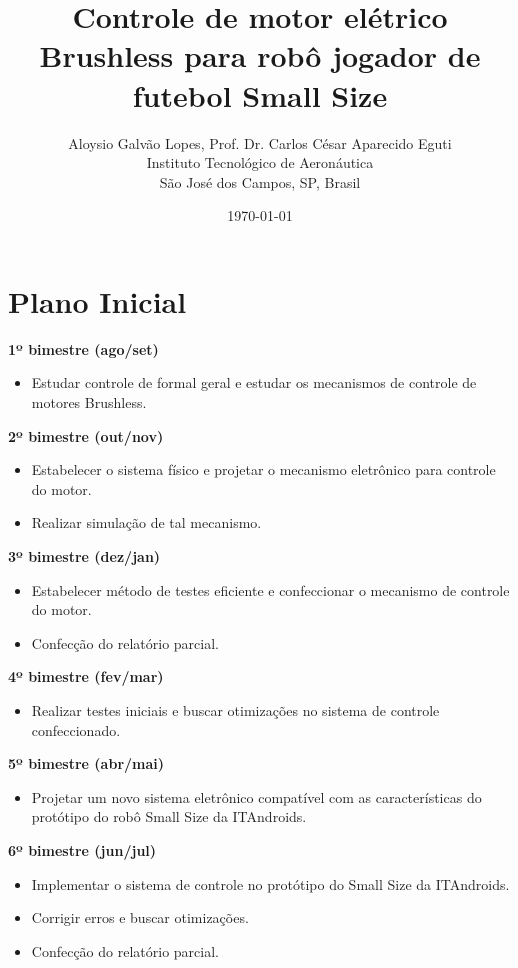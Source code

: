 \documentclass[a4paper,11pt]{article}
\title{\textbf{Controle de motor elétrico Brushless para robô jogador de futebol Small Size}}
\author{Aloysio Galvão Lopes, Prof. Dr. Carlos César Aparecido Eguti\\
	Instituto Tecnológico de Aeronáutica\\
	São José dos Campos, SP, Brasil} %
\date{\today}
\begin{document}
	
	\tableofcontents
	\newpage

	\maketitle
	
	\section{Plano Inicial}
	\textbf{1º bimestre (ago/set)} %
	\begin{itemize}
		\item Estudar controle de formal geral e estudar os mecanismos de controle de motores Brushless.
	\end{itemize}
	\textbf{2º bimestre (out/nov)}
	\begin{itemize}
		\item Estabelecer o sistema físico e projetar o mecanismo eletrônico para controle do motor.
		\item  Realizar simulação de tal mecanismo.
	\end{itemize}
	\textbf{3º bimestre (dez/jan)}
	\begin{itemize}
		\item Estabelecer método de testes eficiente e confeccionar o mecanismo de controle do motor.
		\item Confecção do relatório parcial.
	\end{itemize}
	\textbf{4º bimestre (fev/mar)} %
	\begin{itemize}
		\item Realizar testes iniciais e buscar otimizações no sistema de controle confeccionado.
	\end{itemize}
	\textbf{5º bimestre (abr/mai)}
	\begin{itemize}
		\item Projetar um novo sistema eletrônico compatível com as características do protótipo do robô Small Size da ITAndroids.
	\end{itemize}
	\textbf{6º bimestre (jun/jul)}
	\begin{itemize}
		\item Implementar o sistema de controle no protótipo do Small Size da ITAndroids.
		\item Corrigir erros e buscar otimizações.
		\item Confecção do relatório parcial.
	\end{itemize}
\end{document}
